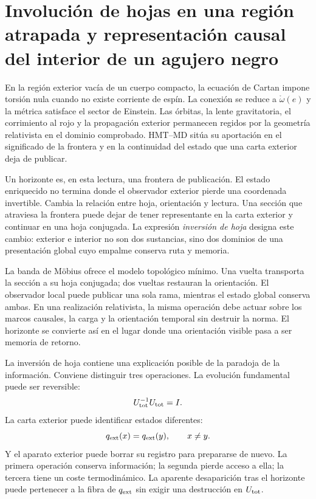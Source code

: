\section{Involución de hojas en una región atrapada y representación causal del interior de un agujero negro}

En la región exterior vacía de un cuerpo compacto, la ecuación de Cartan impone
torsión nula cuando no existe corriente de espín. La conexión se reduce a
\(\mathring\omega(e)\) y la métrica satisface el sector de Einstein. Las órbitas,
la lente gravitatoria, el corrimiento al rojo y la propagación exterior permanecen
regidos por la geometría relativista en el dominio comprobado. HMT--MD sitúa su
aportación en el significado de la frontera y en la continuidad del estado que una
carta exterior deja de publicar.

Un horizonte es, en esta lectura, una frontera de publicación. El estado
enriquecido no termina donde el observador exterior pierde una coordenada
invertible. Cambia la relación entre hoja, orientación y lectura. Una sección que
atraviesa la frontera puede dejar de tener representante en la carta exterior y
continuar en una hoja conjugada. La expresión \emph{inversión de hoja} designa este
cambio: exterior e interior no son dos sustancias, sino dos dominios de una
presentación global cuyo empalme conserva ruta y memoria.

La banda de Möbius ofrece el modelo topológico mínimo. Una vuelta transporta la
sección a su hoja conjugada; dos vueltas restauran la orientación. El observador
local puede publicar una sola rama, mientras el estado global conserva ambas. En
una realización relativista, la misma operación debe actuar sobre los marcos
causales, la carga y la orientación temporal sin destruir la norma. El horizonte
se convierte así en el lugar donde una orientación visible pasa a ser memoria de
retorno.

La inversión de hoja contiene una explicación posible de la paradoja de la
información. Conviene distinguir tres operaciones. La evolución fundamental puede
ser reversible:
\[
 U_{\rm tot}^{-1}U_{\rm tot}=I.
\]
La carta exterior puede identificar estados diferentes:
\[
 q_{\rm ext}(x)=q_{\rm ext}(y),
 \qquad x\neq y.
\]
Y el aparato exterior puede borrar su registro para prepararse de nuevo. La primera
operación conserva información; la segunda pierde acceso a ella; la tercera tiene
un coste termodinámico. La aparente desaparición tras el horizonte puede pertenecer
a la fibra de \(q_{\rm ext}\) sin exigir una destrucción en \(U_{\rm tot}\).

